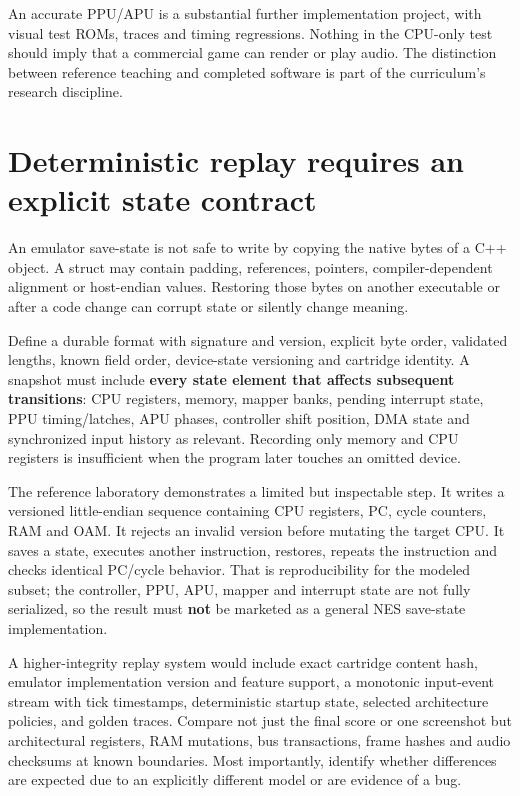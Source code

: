 An accurate PPU/APU is a substantial further implementation project, with visual test ROMs, traces and timing regressions. Nothing in the CPU-only test should imply that a commercial game can render or play audio. The distinction between reference teaching and completed software is part of the curriculum's research discipline.

\section{Deterministic replay requires an explicit state contract}\label{06-engine-ii-ch042-deterministic-replay-requires-an-explicit-state-contract}

An emulator save-state is not safe to write by copying the native bytes of a C++ object. A struct may contain padding, references, pointers, compiler-dependent alignment or host-endian values. Restoring those bytes on another executable or after a code change can corrupt state or silently change meaning.

Define a durable format with signature and version, explicit byte order, validated lengths, known field order, device-state versioning and cartridge identity. A snapshot must include \textbf{every state element that affects subsequent transitions}: CPU registers, memory, mapper banks, pending interrupt state, PPU timing/latches, APU phases, controller shift position, DMA state and synchronized input history as relevant. Recording only memory and CPU registers is insufficient when the program later touches an omitted device.

The reference laboratory demonstrates a limited but inspectable step. It writes a versioned little-endian sequence containing CPU registers, PC, cycle counters, RAM and OAM. It rejects an invalid version before mutating the target CPU. It saves a state, executes another instruction, restores, repeats the instruction and checks identical PC/cycle behavior. That is reproducibility for the modeled subset; the controller, PPU, APU, mapper and interrupt state are not fully serialized, so the result must \textbf{not} be marketed as a general NES save-state implementation.

A higher-integrity replay system would include exact cartridge content hash, emulator implementation version and feature support, a monotonic input-event stream with tick timestamps, deterministic startup state, selected architecture policies, and golden traces. Compare not just the final score or one screenshot but architectural registers, RAM mutations, bus transactions, frame hashes and audio checksums at known boundaries. Most importantly, identify whether differences are expected due to an explicitly different model or are evidence of a bug.

